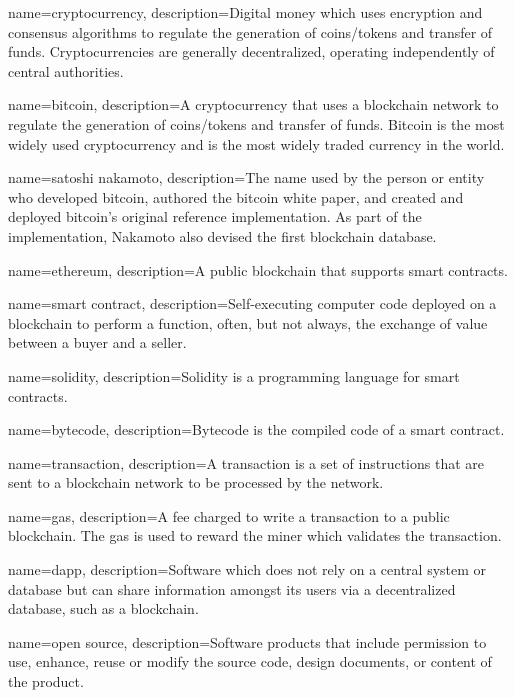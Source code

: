  {
	name=cryptocurrency,
	description={Digital money which uses encryption and consensus algorithms to regulate the generation of coins/tokens and transfer of funds. Cryptocurrencies are generally decentralized, operating independently of central authorities.}
}

 {
	name=bitcoin,
	description={A cryptocurrency that uses a blockchain network to regulate the generation of coins/tokens and transfer of funds. Bitcoin is the most widely used cryptocurrency and is the most widely traded currency in the world.}
}

 {
	name=satoshi nakamoto,
	description={The name used by the person or entity who developed bitcoin, authored the bitcoin white paper, and created and deployed bitcoin's original reference implementation. As part of the implementation, Nakamoto also devised the first blockchain database.}
}


 {
	name=ethereum,
	description={A public blockchain that supports smart contracts.}
}

 {
	name=smart contract,
	description={Self-executing computer code deployed on a blockchain to perform a function, often, but not always, the exchange of value between a buyer and a seller.}
}

 {
	name=solidity,
	description={Solidity is a programming language for smart contracts.}
}

 {
	name=bytecode,
	description={Bytecode is the compiled code of a smart contract.}
}

 {
	name=transaction,
	description={A transaction is a set of instructions that are sent to a blockchain network to be processed by the network.}
}

 {
	name=gas,
	description={A fee charged to write a transaction to a public blockchain. The gas is used to reward the miner which validates the transaction.}
}

 {
	name=dapp,
	description={Software which does not rely on a central system or database but can share information amongst its users via a decentralized database, such as a blockchain.}
}

 {
	name=open source,
	description={Software products that include permission to use, enhance, reuse or modify the source code, design documents, or content of the product.}
}

